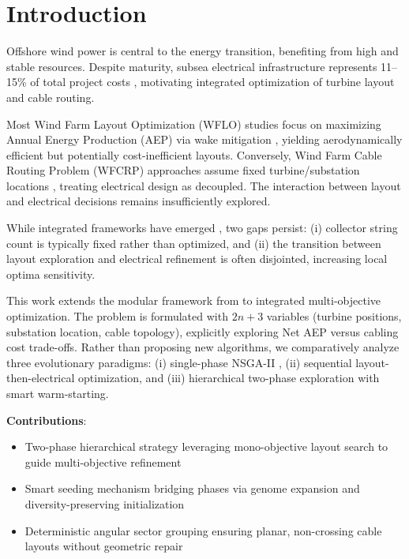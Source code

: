 \documentclass[format=sigconf,anonymous=true,review=true]{acmart}
\begin{document}
\maketitle

\section{Introduction}

Offshore wind power is central to the energy transition, benefiting from high and stable resources. Despite maturity, subsea electrical infrastructure represents 11--15\% of total project costs \cite{Alencar2026Flexible, IRENA2024Costs}, motivating integrated optimization of turbine layout and cable routing.

Most Wind Farm Layout Optimization (WFLO) studies focus on maximizing Annual Energy Production (AEP) via wake mitigation \cite{Silva2025Layout, Baker2019Best}, yielding aerodynamically efficient but potentially cost-inefficient layouts. Conversely, Wind Farm Cable Routing Problem (WFCRP) approaches assume fixed turbine/substation locations \cite{Alencar2026Flexible, Machado2024Hybrid}, treating electrical design as decoupled. The interaction between layout and electrical decisions remains insufficiently explored.

While integrated frameworks have emerged \cite{Wang2019Integrated, Jin2025Integrated}, two gaps persist: (i) collector string count is typically fixed rather than optimized, and (ii) the transition between layout exploration and electrical refinement is often disjointed, increasing local optima sensitivity.

This work extends the modular framework from \cite{Silva2025Layout} to integrated multi-objective optimization. The problem is formulated with $2n+3$ variables (turbine positions, substation location, cable topology), explicitly exploring Net AEP versus cabling cost trade-offs. Rather than proposing new algorithms, we comparatively analyze three evolutionary paradigms: (i) single-phase NSGA-II \cite{Deb2002NSGA2}, (ii) sequential layout-then-electrical optimization, and (iii) hierarchical two-phase exploration with smart warm-starting.

\textbf{Contributions}:
\begin{itemize}
    \item Two-phase hierarchical strategy leveraging mono-objective layout search to guide multi-objective refinement
    \item Smart seeding mechanism bridging phases via genome expansion and diversity-preserving initialization
    \item Deterministic angular sector grouping ensuring planar, non-crossing cable layouts without geometric repair
\end{itemize}
\end{document}
